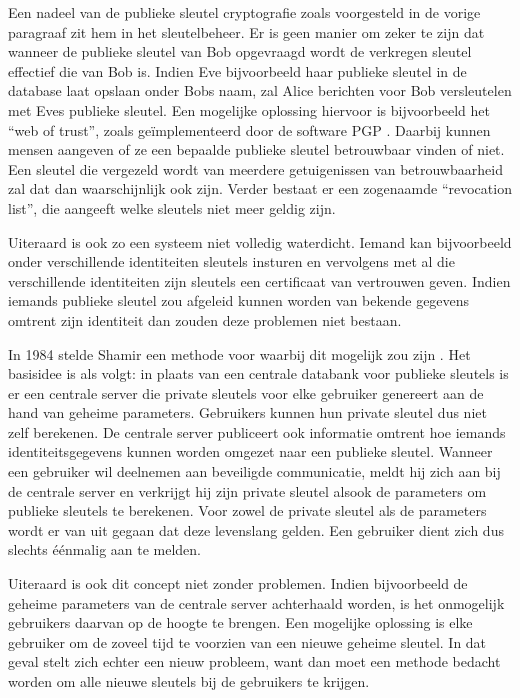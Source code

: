 Een nadeel van de publieke sleutel cryptografie zoals voorgesteld in de vorige paragraaf zit hem in het sleutelbeheer. Er is geen manier om zeker te zijn dat wanneer de publieke sleutel van Bob opgevraagd wordt de verkregen sleutel effectief die van Bob is. Indien Eve bijvoorbeeld haar publieke sleutel in de database laat opslaan onder Bobs naam, zal Alice berichten voor Bob versleutelen met Eves publieke sleutel. Een mogelijke oplossing hiervoor is bijvoorbeeld het ``web of trust'', zoals ge\"implementeerd door de software PGP \cite{pgp}. Daarbij kunnen mensen aangeven of ze een bepaalde publieke sleutel betrouwbaar vinden of niet. Een sleutel die vergezeld wordt van meerdere getuigenissen van betrouwbaarheid zal dat dan waarschijnlijk ook zijn. Verder bestaat er een zogenaamde ``revocation list'', die aangeeft welke sleutels niet meer geldig zijn.

Uiteraard is ook zo een systeem niet volledig waterdicht. Iemand kan bijvoorbeeld onder verschillende identiteiten sleutels insturen en vervolgens met al die verschillende identiteiten zijn sleutels een certificaat van vertrouwen geven. Indien iemands publieke sleutel zou afgeleid kunnen worden van bekende gegevens omtrent zijn identiteit dan zouden deze problemen niet bestaan.

In 1984 stelde Shamir een methode voor waarbij dit mogelijk zou zijn \cite{shamir}. Het basisidee is als volgt: in plaats van een centrale databank voor publieke sleutels is er een centrale server die private sleutels voor elke gebruiker genereert aan de hand van geheime parameters. Gebruikers kunnen hun private sleutel dus niet zelf berekenen. De centrale server publiceert ook informatie omtrent hoe iemands identiteitsgegevens kunnen worden omgezet naar een publieke sleutel. Wanneer een gebruiker wil deelnemen aan beveiligde communicatie, meldt hij zich aan bij de centrale server en verkrijgt hij zijn private sleutel alsook de parameters om publieke sleutels te berekenen. Voor zowel de private sleutel als de parameters wordt er van uit gegaan dat deze levenslang gelden. Een gebruiker dient zich dus slechts \'e\'enmalig aan te melden.

Uiteraard is ook dit concept niet zonder problemen. Indien bijvoorbeeld de geheime parameters van de centrale server achterhaald worden, is het onmogelijk gebruikers daarvan op de hoogte te brengen. Een mogelijke oplossing is elke gebruiker om de zoveel tijd te voorzien van een nieuwe geheime sleutel. In dat geval stelt zich echter een nieuw probleem, want dan moet een methode bedacht worden om alle nieuwe sleutels bij de gebruikers te krijgen. 

